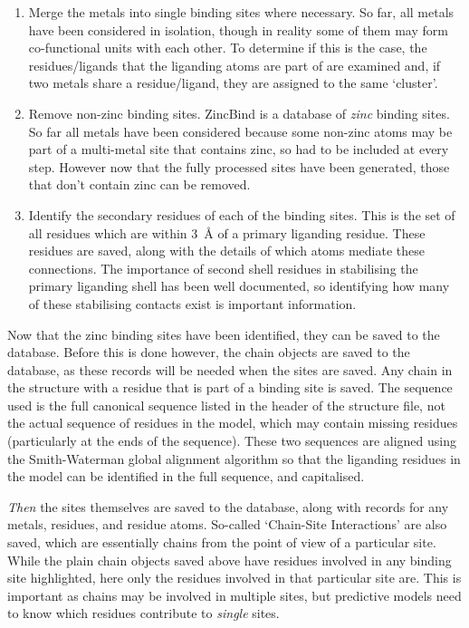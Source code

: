 \begin{enumerate}
   \item Merge the metals into single binding sites where necessary. So far, all metals have been considered in isolation, though in reality some of them may form co-functional units with each other. To determine if this is the case, the residues/ligands that the liganding atoms are part of are examined and, if two metals share a residue/ligand, they are assigned to the same `cluster'.
   \item Remove non-zinc binding sites. ZincBind is a database of \emph{zinc} binding sites. So far all metals have been considered because some non-zinc atoms may be part of a multi-metal site that contains zinc, so had to be included at every step. However now that the fully processed sites have been generated, those that don't contain zinc can be removed.
   \item Identify the secondary residues of each of the binding sites. This is the set of all residues which are within 3~{\AA} of a primary liganding residue. These residues are saved, along with the details of which atoms mediate these connections. The importance of second shell residues in stabilising the primary liganding shell has been well documented, so identifying how many of these stabilising contacts exist is important information.
\end{enumerate}

Now that the zinc binding sites have been identified, they can be saved to the database. Before this is done however, the chain objects are saved to the database, as these records will be needed when the sites are saved. Any chain in the structure with a residue that is part of a binding site is saved. The sequence used is the full canonical sequence listed in the header of the structure file, not the actual sequence of residues in the model, which may contain missing residues (particularly at the ends of the sequence). These two sequences are aligned using the Smith-Waterman global alignment algorithm \cite{smith1981alignment} so that the liganding residues in the model can be identified in the full sequence, and capitalised.

\emph{Then} the sites themselves are saved to the database, along with records for any metals, residues, and residue atoms. So-called `Chain-Site Interactions' are also saved, which are essentially chains from the point of view of a particular site. While the plain chain objects saved above have residues involved in any binding site highlighted, here only the residues involved in that particular site are. This is important as chains may be involved in multiple sites, but predictive models need to know which residues contribute to \emph{single} sites.

